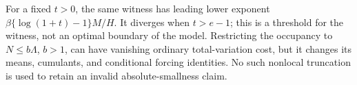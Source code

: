 For a fixed $t>0$, the same witness has leading lower exponent
$\beta\{\log(1+t)-1\}M/H$. It diverges when $t>e-1$; this is a threshold for the witness, not an optimal boundary of the model. Restricting the occupancy to $N\le b\Lambda$, $b>1$, can have vanishing ordinary total-variation cost, but it changes its means, cumulants, and conditional forcing identities. No such nonlocal truncation is used to retain an invalid absolute-smallness claim.
